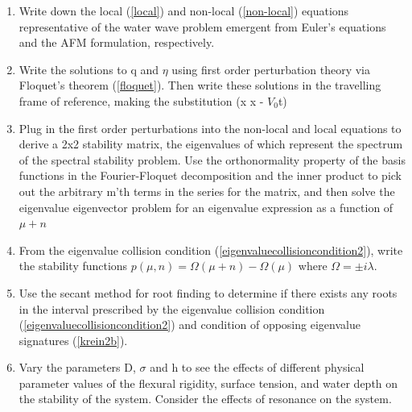 \documentclass{article}
\begin{document}
\begin{enumerate}
  \item Write down the local (\ref{local}) and non-local (\ref{non-local}) equations representative of the water wave problem emergent from Euler's equations and the AFM formulation, respectively.
  \item Write the solutions to q and \(\eta\) using first order perturbation theory via Floquet's theorem (\ref{floquet}). Then write these solutions in the travelling frame of reference, making the substitution (x \implies x - \(V_{0}\)t)
  \item Plug in the first order perturbations into the non-local and local equations to derive a 2x2 stability matrix, the eigenvalues of which represent the spectrum of the spectral stability problem. Use the orthonormality property of the basis functions in the Fourier-Floquet decomposition and the inner product to pick out the arbitrary m'th terms in the series for the matrix, and then solve the eigenvalue eigenvector problem for an eigenvalue expression as a function of \(\mu + n\)
  \item From the eigenvalue collision condition (\ref{eigenvaluecollisioncondition2}), write the stability functions \(p(\mu,n) = \Omega(\mu + n) - \Omega(\mu)\) where \( \Omega = \pm i\lambda\). 
  \item Use the secant method for root finding to determine if there exists any roots in the interval prescribed by the eigenvalue collision condition (\ref{eigenvaluecollisioncondition2}) and condition of opposing eigenvalue signatures (\ref{krein2b}). 
  \item Vary the parameters D, \(\sigma\) and h to see the effects of different physical parameter values of the flexural rigidity, surface tension, and water depth on the stability of the system. Consider the effects of resonance on the system.
\end{enumerate}
\\
\end{document}
